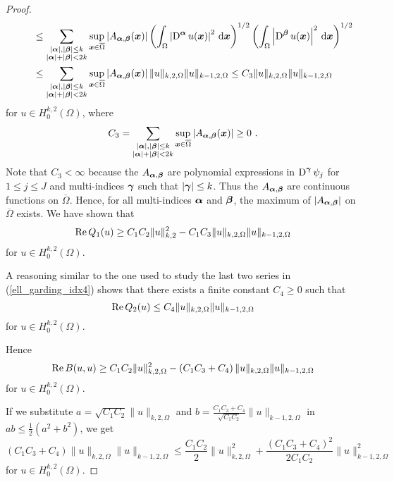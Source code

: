 \begin{proof}
\begin{align*}
&\qquad \leq \sum_{\substack{|{\bm{\alpha}}|,|{\bm{\beta}}|\leq k\\
|{\bm{\alpha}}|+|{\bm{\beta}}|<2k}} \sup_{{\bm{x}} \in \overline{\Omega}}
\left| A_{{\bm{\alpha}},{\bm{\beta}}}({\bm{x}})\right|
\left( \int_\Omega \left| \operatorname{D}^{{\bm{\alpha}}} u({\bm{x}}) \right|^2
\,\mathrm{d}{{\bm{x}}}\right)^{1/2}
\left( \int_\Omega \left| \operatorname{D}^{{\bm{\beta}}} u({\bm{x}}) \right|^2 \,\mathrm{d}{{\bm{x}}}
\right)^{1/2} \\
&\qquad \leq \sum_{\substack{|{\bm{\alpha}}|,|{\bm{\beta}}|\leq k\\
|{\bm{\alpha}}|+|{\bm{\beta}}|<2k}} \sup_{{\bm{x}} \in \overline{\Omega}}
\left| A_{{\bm{\alpha}},{\bm{\beta}}}({\bm{x}})\right|
\|u\|_{k,2,\Omega} \|u\|_{k-1,2,\Omega}
\leq C_3 \|u\|_{k,2,\Omega} \|u\|_{k-1,2,\Omega} 
\end{align*}
for $\displaystyle u \in H^{k,2}_0(\Omega)$, where
\[
C_3 = \sum_{\substack{|{\bm{\alpha}}|,|{\bm{\beta}}|\leq
k\\|{\bm{\alpha}}|+|{\bm{\beta}}|<2k}} \sup_{{\bm{x}} \in \overline{\Omega}}
\left| A_{{\bm{\alpha}},{\bm{\beta}}}({\bm{x}})\right| \geq 0 \  .
\]
Note that $C_3 < \infty$ because the $A_{{\bm{\alpha}},{\bm{\beta}}}$ are
polynomial expressions in $\displaystyle \operatorname{D}^{{\bm{\gamma}}} \psi_j$ for
$1\leq j \leq J$ and multi-indices ${\bm{\gamma}}$ such that
$|{\bm{\gamma}}|\leq k$.  Thus the $A_{{\bm{\alpha}},{\bm{\beta}}}$ are
continuous functions on $\overline{\Omega}$.  Hence, for
all multi-indices ${\bm{\alpha}}$ and ${\bm{\beta}}$, the
maximum of $|A_{{\bm{\alpha}},{\bm{\beta}}}|$
on $\overline{\Omega}$ exists.  We have shown that
\[
\operatorname{Re} Q_1(u) \geq C_1C_2 \|u\|_{k,2}^2
- C_1C_3 \|u\|_{k,2,\Omega} \|u\|_{k-1,2,\Omega} 
\]
for $\displaystyle u \in H^{k,2}_0(\Omega)$.

A reasoning similar to the one used to study the last two series in
(\ref{ell_garding_idx4}) shows that there exists a finite constant
$C_4 \geq 0$ such that
\[
\operatorname{Re} Q_2(u) \leq C_4 \|u\|_{k,2,\Omega} \|u\|_{k-1,2,\Omega} 
\]
for $\displaystyle u \in H^{k,2}_0(\Omega)$.

Hence
\begin{equation} \label{ell_garding_idx2}
\operatorname{Re} B(u,u) \geq C_1C_2 \|u\|_{k,2,\Omega}^2 - \left( C_1C_3 + C_4\right)
\|u\|_{k,2,\Omega} \|u\|_{k-1,2,\Omega}
\end{equation}
for $\displaystyle u \in H^{k,2}_0(\Omega)$.

If we substitute $a= \sqrt{C_1C_2} \|u\|_{k,2,\Omega}$ and
$\displaystyle b = \frac{C_1C_3 + C_4}{\sqrt{C_1C_2}}\|u\|_{k-1,2,\Omega}$ in
$\displaystyle ab \leq \frac{1}{2}(a^2+b^2)$, we get
\[
\left( C_1C_3 + C_4\right) \|u\|_{k,2,\Omega} \|u\|_{k-1,2,\Omega}
\leq \frac{C_1C_2}{2} \|u\|_{k,2,\Omega}^2 +
\frac{(C_1C_3 + C_4)^2}{2C_1C_2}\|u\|_{k-1,2,\Omega}^2
\]
for $\displaystyle u \in H^{k,2}_0(\Omega)$.


\end{proof}
